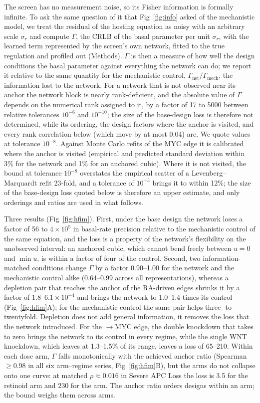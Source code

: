 The screen has no measurement noise, so its Fisher information is formally
infinite. To ask the same question of it that Fig~\ref{fig:info} asked of the
mechanistic model, we treat the residual of the hosting equation as noisy with
an arbitrary scale $\sigma_r$ and compute $\Gamma$, the CRLB of the basal parameter
per unit $\sigma_r$, with the learned term represented by the screen's own
network, fitted to the true regulation and profiled out (Methods). $\Gamma$ is then
a measure of how well the design conditions the basal parameter against
everything the network can do; we report it relative to the same quantity for
the mechanistic control, $\Gamma_{\text{net}}/\Gamma_{\text{mech}}$, the information lost
to the network. For a network that is not observed near its anchor the
network block is nearly rank-deficient, and the absolute value of $\Gamma$ depends on
the numerical rank assigned to it, by a factor of 17 to 5000 between relative
tolerances $10^{-6}$ and $10^{-10}$; the size of the base-design loss is
therefore not determined, while its ordering, the design factors where the
anchor is visited, and every rank correlation below (which move by at most 0.04)
are. We quote values at tolerance $10^{-8}$. Against Monte Carlo refits of the MYC edge it is
calibrated where the anchor is visited (empirical and predicted standard
deviation within 3\% for the network and 1\% for an anchored cubic). Where it is
not visited, the bound at tolerance $10^{-8}$ overstates the empirical scatter of
a Levenberg--Marquardt refit 23-fold, and a tolerance of $10^{-5}$ brings it to
within 12\%; the size of the base-design loss quoted below is therefore an
upper estimate, and only orderings and ratios are used in what follows.

Three results (Fig~\ref{fig:hfim}). First, under the base design the network
loses a factor of 56 to $4\times10^5$ in basal-rate precision relative to the
mechanistic control of the same equation, and the loss is a property of the
network's flexibility on the unobserved interval: an anchored cubic, which
cannot bend freely between $u=0$ and $\min u$, is within a factor of four of the
control. Second, two
information-matched conditions change $\Gamma$ by a factor 0.90--1.00 for the
network and the mechanistic control alike (0.64--0.99 across all
representations), whereas a depletion pair that reaches the anchor of the
RA-driven edges shrinks it by a factor of $1.8$--$6.1\times10^{-4}$ and brings the network
to 1.0--1.4 times its control (Fig~\ref{fig:hfim}A); for the mechanistic
control the same pair helps three- to twentyfold. Depletion does not add general
information, it removes the loss that the network introduced. For the
\bcat{}$\to$MYC edge, the double knockdown that takes \bcat{} to zero brings the
network to its control in every regime, while the single WNT knockdown, which
leaves \bcat{} at 1.3--1.5\% of its range, leaves a loss of 65--210. Within each dose
arm, $\Gamma$ falls monotonically with the achieved anchor ratio (Spearman $\ge0.98$
in all six arm--regime series, Fig~\ref{fig:hfim}B), but the arms do not
collapse onto one curve: at matched $\rho\approx0.016$ in Severe APC Loss the
loss is 3.5 for the retinoid arm and 230 for the \bcat{} arm. The anchor ratio
orders designs within an arm; the bound weighs them across arms.


